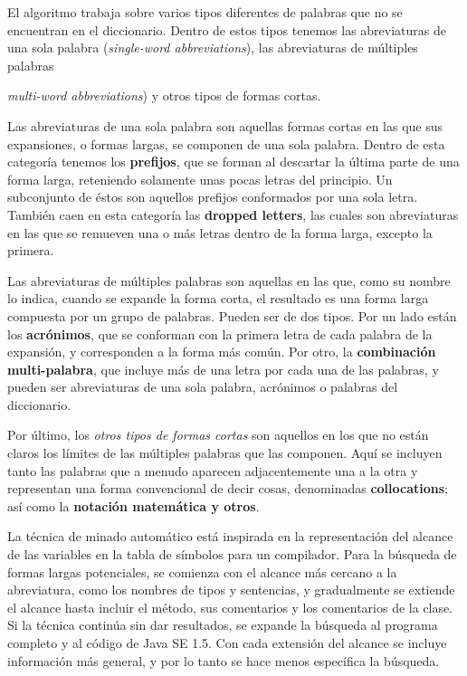 El algoritmo trabaja sobre varios tipos diferentes de palabras que no se encuentran en el diccionario.
Dentro de estos tipos tenemos las abreviaturas de una sola palabra (\textit{single-word abbreviations}), las abreviaturas de múltiples palabras {\textit{multi-word abbreviations}) y otros tipos de formas cortas.

Las abreviaturas de una sola palabra son aquellas formas cortas en las que sus expansiones, o formas largas, se componen de una sola palabra.
Dentro de esta categoría tenemos los \textbf{prefijos}, que se forman al descartar la última parte de una forma larga, reteniendo solamente unas pocas letras del principio.
Un subconjunto de éstos son aquellos prefijos conformados por una sola letra.
También caen en esta categoría las \textbf{dropped letters}, las cuales son abreviaturas en las que se remueven una o más letras dentro de la forma larga, excepto la primera.

Las abreviaturas de múltiples palabras son aquellas en las que, como su nombre lo indica, cuando se expande la forma corta, el resultado es una forma larga compuesta por un grupo de palabras.
Pueden ser de dos tipos.
Por un lado están los \textbf{acrónimos}, que se conforman con la primera letra de cada palabra de la expansión, y corresponden a la forma más común.
Por otro, la \textbf{combinación multi-palabra}, que incluye más de una letra por cada una de las palabras, y pueden ser abreviaturas de una sola palabra, acrónimos o palabras del diccionario.

Por último, los \textit{otros tipos de formas cortas} son aquellos en los que no están claros los límites de las múltiples palabras que las componen.
Aquí se incluyen tanto las palabras que a menudo aparecen adjacentemente una a la otra y representan una forma convencional de decir cosas, denominadas \textbf{collocations}; así como la \textbf{notación matemática y otros}.

La técnica de minado automático está inspirada en la representación del alcance de las variables en la tabla de símbolos para un compilador.
Para la búsqueda de formas largas potenciales, se comienza con el alcance más cercano a la abreviatura, como los nombres de tipos y sentencias, y gradualmente se extiende el alcance hasta incluir el método, sus comentarios y los comentarios de la clase.
Si la técnica continúa sin dar resultados, se expande la búsqueda al programa completo y al código de Java SE 1.5.
Con cada extensión del alcance se incluye información más general, y por lo tanto se hace menos específica la búsqueda.

}
